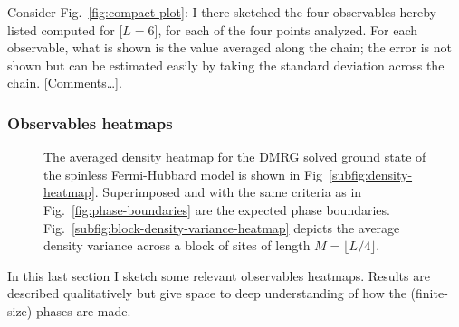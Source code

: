 Consider Fig.~\ref{fig:compact-plot}: I there sketched the four observables hereby listed computed for {\color{tabred}[$L=6$]}, for each of the four points analyzed. For each observable, what is shown is the value averaged along the chain; the error is not shown but can be estimated easily by taking the standard deviation across the chain. {\color{tabred} [Comments\dots]}.

\subsubsection{Observables heatmaps}

\begin{figure}
	\centering
	\caption{The averaged density heatmap for the DMRG solved ground state of the spinless Fermi-Hubbard model is shown in Fig~\ref{subfig:density-heatmap}. Superimposed and with the same criteria as in Fig.~\ref{fig:phase-boundaries} are the expected phase boundaries. Fig.~\ref{subfig:block-density-variance-heatmap} depicts the average density variance across a block of sites of length $M = \lfloor L/4 \rfloor$.}
	\label{fig:density-heatmaps}
\end{figure}

In this last section I sketch some relevant observables heatmaps. Results are described qualitatively but give space to deep understanding of how the (finite-size) phases are made.

